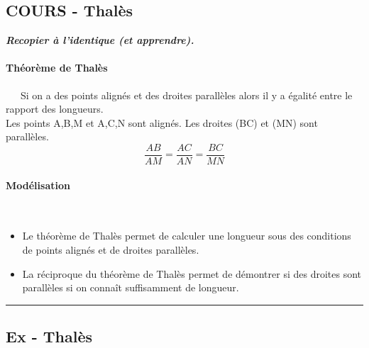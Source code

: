 \documentclass[11pt]{article}
\newcommand{\horrule}[1]{\rule{\linewidth}{#1}} %
\begin{document}
\begin{multicols}{2}

  \subsection*{COURS - Thalès}
  \textit{\textbf{Recopier à l'identique (et apprendre).}}
  \paragraph{Théorème de Thalès}~~\
  Si on a des points alignés et des droites parallèles alors il y a égalité entre le rapport des longueurs.\\
  Les points A,B,M et A,C,N sont alignés. Les droites (BC) et (MN) sont parallèles.\\
  $$ \dfrac{AB}{AM} = \dfrac{AC}{AN} = \dfrac{BC}{MN}$$
  \paragraph{Modélisation}~~\
  \begin{itemize}
  \item Le théorème de Thalès permet de calculer une longueur sous des conditions de points alignés et de droites parallèles.
  \item La réciproque du théorème de Thalès permet de démontrer si des droites sont parallèles si on connaît suffisamment de longueur.
  \end{itemize}
\end{multicols}

\horrule{1px} 

\subsection*{Ex - Thalès}
\end{document}
